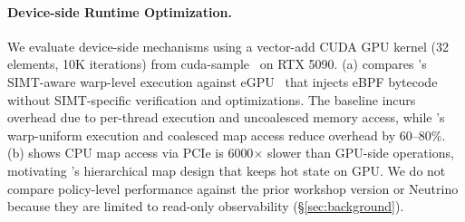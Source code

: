 \paragraph{Device-side Runtime Optimization.}
We evaluate device-side \sys mechanisms using a vector-add CUDA GPU kernel (32 elements, 10K iterations) from cuda-sample~\cite{nvidia_cuda_samples} on RTX 5090.
(a) compares \sys's SIMT-aware warp-level execution against eGPU~\cite{egpu} that injects eBPF bytecode without SIMT-specific verification and optimizations.
The baseline incurs overhead due to per-thread execution and uncoalesced memory access, while \sys's warp-uniform execution and coalesced map access reduce overhead by 60--80\%.
(b) shows CPU map access via PCIe is 6000$\times$ slower than GPU-side operations, motivating \sys's hierarchical map design that keeps hot state on GPU.
We do not compare policy-level performance against the prior workshop version or Neutrino because they are limited to read-only observability (\S\ref{sec:background}). %
